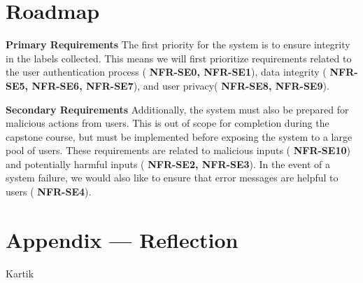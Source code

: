\documentclass{article}
\begin{document}
\section{Roadmap}

\textbf{Primary Requirements}
The first priority for the system is to ensure integrity in the labels collected. This means we will first prioritize requirements
related to the user authentication process (
\textbf{NFR-SE0, NFR-SE1}), data integrity (
  \textbf{NFR-SE5, NFR-SE6, NFR-SE7}), and user privacy(
    \textbf{NFR-SE8, NFR-SE9}).

\textbf{Secondary Requirements}
Additionally, the system must also be prepared for malicious actions from users. This is out of scope for completion during the capstone course, but must be implemented
before exposing the system to a large pool of users. These requirements are related to malicious inputs (
  \textbf{NFR-SE10}) and potentially harmful inputs (
    \textbf{NFR-SE2, NFR-SE3}). In the event of a system failure, we would also like to ensure that error messages are helpful to users (
      \textbf{NFR-SE4}).

\newpage{}

\section*{Appendix --- Reflection}




Kartik \\
\end{document}
